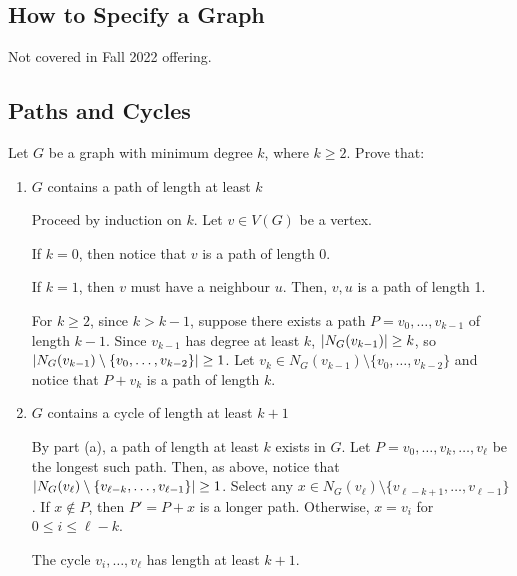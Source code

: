 \documentclass[class=math239,notes,tikz]{agony}
\begin{document}
\subsection{How to Specify a Graph}

Not covered in Fall 2022 offering.

\subsection{Paths and Cycles}
\begin{xca}\label{xca:deg-path}
  Let $G$ be a graph with minimum degree $k$, where $k \geq 2$.
  Prove that:
\end{xca}
\begin{enumerate}
  \item $G$ contains a path of length at least $k$
        \begin{prf}
          Proceed by induction on $k$.
          Let $v \in V(G)$ be a vertex.

          If $k = 0$, then notice that $v$ is a path of length 0.

          If $k = 1$, then $v$ must have a neighbour $u$.
          Then, $v,u$ is a path of length 1.

          For $k \geq 2$, since $k > k-1$, suppose
          there exists a path $P = v_0,\dotsc,v_{k-1}$ of length $k-1$.
          Since $v_{k-1}$ has degree at least $k$, $\abs{N_G(v_{k-1})} \geq k$,
          so $\abs{N_G(v_{k-1}) \setminus \{v_0,\dotsc,v_{k-2}\}} \geq 1$.
          Let $v_k \in N_G(v_{k-1}) \setminus \{v_0,\dotsc,v_{k-2}\}$
          and notice that $P + v_k$ is a path of length $k$.
        \end{prf}
  \item $G$ contains a cycle of length at least $k+1$
        \begin{prf}
          By part (a), a path of length at least $k$ exists in $G$.
          Let $P = v_0,\dotsc,v_k,\dotsc,v_\ell$ be the longest such path.
          Then, as above, notice that $\abs{N_G(v_\ell) \setminus \{v_{\ell-k},\dotsc,v_{\ell-1}\}} \geq 1$.
          Select any $x \in N_G(v_\ell) \setminus \{v_{\ell-k+1},\dotsc,v_{\ell-1}\}$.
          If $x \not\in P$, then $P' = P + x$ is a longer path.
          Otherwise, $x = v_i$ for $0 \leq i \leq \ell-k$.

          The cycle $v_i,\dotsc,v_\ell$ has length at least $k+1$.
        \end{prf}
\end{enumerate}
\end{document}
